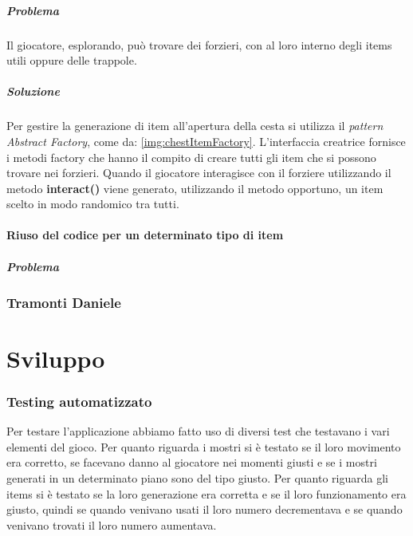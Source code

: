 \documentclass{report}
\begin{document}
\paragraph{Problema} Il giocatore, esplorando, può trovare dei forzieri, con al loro interno degli items utili oppure delle trappole. 

\paragraph{Soluzione} Per gestire la generazione di item all'apertura della cesta si utilizza il \textit{pattern Abstract Factory}, come da: \ref{img:chestItemFactory}.
%
L'interfaccia creatrice fornisce i metodi factory che hanno il compito di creare tutti gli item che si possono trovare nei forzieri. 
%
Quando il giocatore interagisce con il forziere utilizzando il metodo \textbf{interact()} viene generato, utilizzando il metodo opportuno, un item scelto in modo randomico tra tutti.

\subsubsection{Riuso del codice per un determinato tipo di item}

\paragraph{Problema} 

\subsection{Tramonti Daniele}

\chapter{Sviluppo}

\subsection{Testing automatizzato}
Per testare l'applicazione abbiamo fatto uso di diversi test che testavano i vari elementi del gioco. 
%
Per quanto riguarda i mostri si è testato se il loro movimento era corretto, se facevano danno al giocatore nei momenti giusti e se i mostri generati in un determinato piano sono del tipo giusto.
%
Per quanto riguarda gli items si è testato se la loro generazione era corretta e se il loro funzionamento era giusto, quindi se quando venivano usati il loro numero decrementava e se quando venivano trovati il loro numero aumentava.
%
\end{document}
